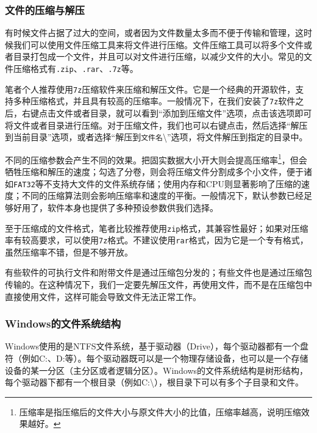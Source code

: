 \documentclass[../main.tex]{subfiles}
\begin{document}
\subsubsection{文件的压缩与解压}

有时候文件占据了过大的空间，或者因为文件数量太多而不便于传输和管理，这时候我们可以使用文件压缩工具来将文件进行压缩。文件压缩工具可以将多个文件或者目录打包成一个文件，并且可以对文件进行压缩，以减少文件的大小。常见的文件压缩格式有\texttt{.zip}、\texttt{.rar}、\texttt{.7z}等。

笔者个人推荐使用\texttt{7z}压缩软件来压缩和解压文件。它是一个经典的开源软件，支持多种压缩格式，并且具有较高的压缩率。一般情况下，在我们安装了\texttt{7z}软件之后，右键点击文件或者目录，就可以看到“添加到压缩文件”选项，点击该选项即可将文件或者目录进行压缩。对于压缩文件，我们也可以右键点击，然后选择“解压到当前目录”选项，或者选择“解压到\texttt{文件名}\textbackslash”选项，将文件解压到指定的目录中。

不同的压缩参数会产生不同的效果。把固实数据大小开大则会提高压缩率\footnote{压缩率是指压缩后的文件大小与原文件大小的比值，压缩率越高，说明压缩效果越好。}，但会牺牲压缩和解压的速度；勾选了分卷，则会将压缩文件分割成多个小文件，便于诸如\texttt{FAT32}等不支持大文件的文件系统存储；使用内存和CPU则显著影响了压缩的速度；不同的压缩算法则会影响压缩率和速度的平衡。一般情况下，默认参数已经足够好用了，软件本身也提供了多种预设参数供我们选择。

至于压缩成的文件格式，笔者比较推荐使用\texttt{zip}格式，其兼容性最好；如果对压缩率有较高要求，可以使用\texttt{7z}格式。不建议使用\texttt{rar}格式，因为它是一个专有格式，虽然压缩率不错，但是不够开放。

\begin{caution}
  有些软件的可执行文件和附带文件是通过压缩包分发的；有些文件也是通过压缩包传输的。在这种情况下，我们一定要先解压文件，再使用文件，而不是在压缩包中直接使用文件，这样可能会导致文件无法正常工作。
\end{caution}

\subsubsection{Windows的文件系统结构}

Windows使用的是NTFS文件系统，基于驱动器（Drive），每个驱动器都有一个盘符（例如C:、D:等）。每个驱动器既可以是一个物理存储设备，也可以是一个存储设备的某一分区（主分区或者逻辑分区）。Windows的文件系统结构是树形结构，每个驱动器下都有一个根目录（例如C:\textbackslash），根目录下可以有多个子目录和文件。
\end{document}
